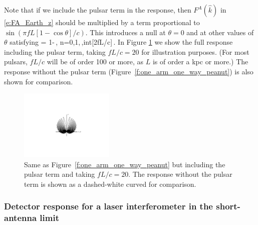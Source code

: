 Note that if we include the pulsar term in the response,
then $F^A(\hat k)$ in \eqref{e:FA_Earth_z} 
should be multiplied 
by a term proportional to $\sin(\pi f L[1-\cos\theta]/c)$.
This introduces a null at $\theta=0$ and at other values 
of $\theta$ satisfying
%
\be
\cos\theta = 1-\,,
\qquad n=0,1,\cdots\,,{\rm int}[2fL/c]\,.
\ee
%
In Figure \ref{f:one_arm_one_way_peanut_full} we show
the full response including the pulsar term,
taking $fL/c=20$ for illustration purposes.
(For most pulsars, $fL/c$ will be of order 100 
or more, as $L$ is of order a kpc or more.)
The response without the pulsar term 
(Figure~\ref{f:one_arm_one_way_peanut}) is also
shown for comparison.
%
\begin{figure}[htbp!]
\begin{center}
\includegraphics[width=0.4\textwidth]{Figures/pulsarPeanutComparison}
\caption{Same as Figure~\ref{f:one_arm_one_way_peanut} but 
including the pulsar term and taking $fL/c=20$.
The response without the pulsar term is shown as a 
dashed-white curved for comparison.}
\label{f:one_arm_one_way_peanut_full}
\end{center}
\end{figure}
%

\subsubsection{Detector response for a laser interferometer 
in the short-antenna limit}

